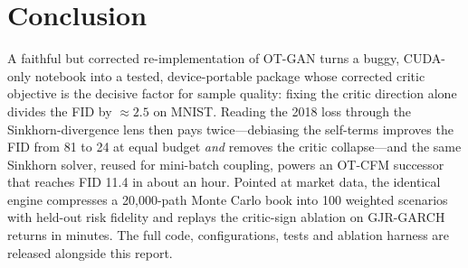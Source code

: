 \documentclass[10pt,twocolumn]{article}
\begin{document}
\section{Conclusion}
A faithful but corrected re-implementation of OT-GAN turns a buggy, CUDA-only notebook into a
tested, device-portable package whose corrected critic objective is the decisive factor for
sample quality: fixing the critic direction alone divides the FID by $\approx 2.5$ on MNIST.
Reading the 2018 loss through the Sinkhorn-divergence lens then pays twice---debiasing the
self-terms improves the FID from 81 to 24 at equal budget \emph{and} removes the critic
collapse---and the same Sinkhorn solver, reused for mini-batch coupling, powers an OT-CFM
successor that reaches FID 11.4 in about an hour. Pointed at market data, the identical
engine compresses a 20{,}000-path Monte Carlo book into 100 weighted scenarios with
held-out risk fidelity and replays the critic-sign ablation on GJR-GARCH returns in
minutes. The full code, configurations, tests and
ablation harness are released alongside this report.
\end{document}
